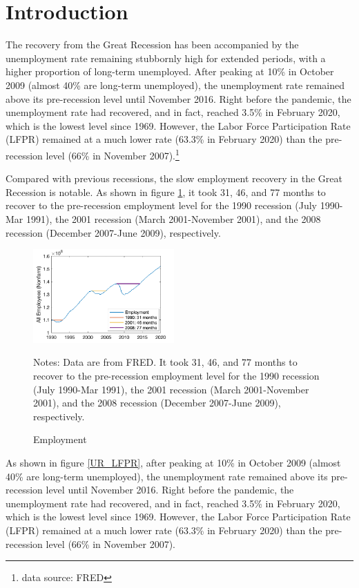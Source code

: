 \documentclass[12pt]{article}
\newcommand{\1}{\mathbb{1}}
\begin{document}
\section{Introduction}
The recovery from the Great Recession has been accompanied by the unemployment rate remaining stubbornly high for extended periods, with a higher proportion of long-term unemployed. After peaking at 10\% in October 2009 (almost 40\% are long-term unemployed), the unemployment rate remained above its pre-recession level until November 2016. Right before the pandemic, the unemployment rate had recovered, and in fact, reached 3.5\% in February 2020, which is the lowest level since 1969. However, the Labor Force Participation Rate (LFPR) remained at a much lower rate (63.3\% in February 2020) than the pre-recession level (66\% in November 2007).\footnote{data source: FRED} 

Compared with previous recessions, the slow employment recovery in the Great Recession is notable. As shown in figure \ref{Employment}, it took 31, 46, and 77 months to recover to the pre-recession employment level for the 1990 recession (July 1990-Mar 1991), the 2001 recession (March 2001-November 2001), and the 2008 recession (December 2007-June 2009), respectively. 


\begin{figure}[h!]
\begin{center}
\includegraphics[width=0.48\textwidth]{Employment}
\end{center}
\caption{Employment}
\label{Employment}
{\scriptsize Notes: Data are from FRED. It took 31, 46, and 77 months to recover to the pre-recession employment level for the 1990 recession (July 1990-Mar 1991), the 2001 recession (March 2001-November 2001), and the 2008 recession (December 2007-June 2009), respectively. } 
\end{figure}

As shown in figure \ref{UR_LFPR}, after peaking at 10\% in October 2009 (almost 40\% are long-term unemployed), the unemployment rate remained above its pre-recession level until November 2016. Right before the pandemic, the unemployment rate had recovered, and in fact, reached 3.5\% in February 2020, which is the lowest level since 1969. However, the Labor Force Participation Rate (LFPR) remained at a much lower rate (63.3\% in February 2020) than the pre-recession level (66\% in November 2007). 
\end{document}

